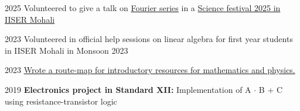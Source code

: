 \documentclass{LoLaTeXcv}
\begin{document}










\begin{lltxItemize}
	\item[2025] Volunteered to give a talk on \href{https://ggl.link/fourier}{Fourier series} in a \href{https://www.iisermohali.ac.in/events/regular/science-festival-2025}{Science festival 2025 in IISER Mohali}
	\item[2023] Volunteered in official help sessions on linear algebra for first year students in IISER Mohali in Monsoon 2023
	\item[2023] \href{https://rupadarshiray.github.io/academia/inculcation}{Wrote a route-map for introductory resources for mathematics and physics.}
	\item[2019] \textbf{Electronics project in Standard XII:} Implementation of A $\cdot$ B + C using resistance-transistor logic
\end{lltxItemize}
\end{document}
